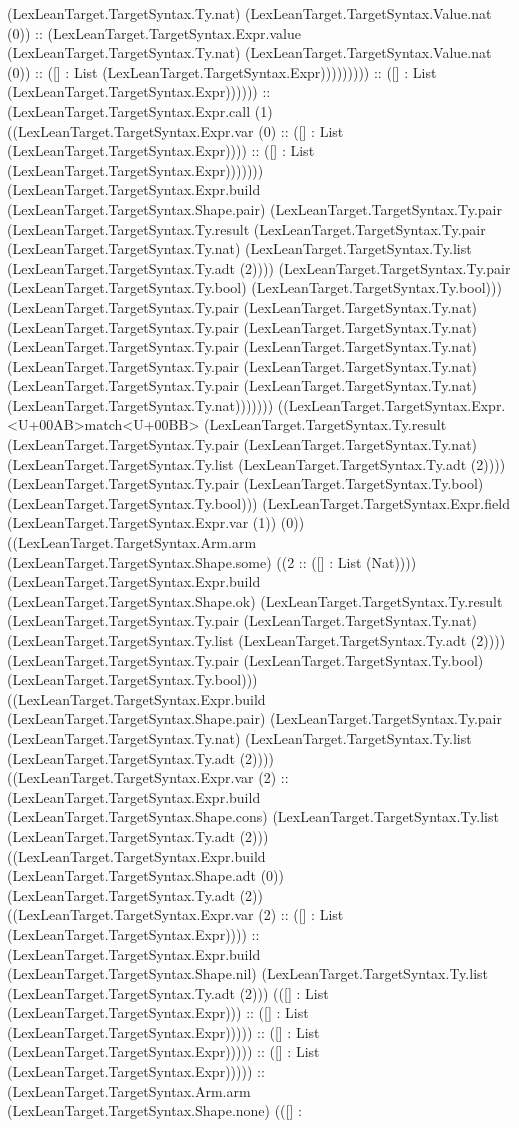 \documentclass[11pt]{article}
\begin{document}
(LexLeanTarget.TargetSyntax.Ty.nat) (LexLeanTarget.TargetSyntax.Value.nat (0)) :: (LexLeanTarget.TargetSyntax.Expr.value (LexLeanTarget.TargetSyntax.Ty.nat) (LexLeanTarget.TargetSyntax.Value.nat (0)) :: ([] : List (LexLeanTarget.TargetSyntax.Expr))))))))) :: ([] : List (LexLeanTarget.TargetSyntax.Expr)))))) :: (LexLeanTarget.TargetSyntax.Expr.call (1) ((LexLeanTarget.TargetSyntax.Expr.var (0) :: ([] : List (LexLeanTarget.TargetSyntax.Expr)))) :: ([] : List (LexLeanTarget.TargetSyntax.Expr))))))) (LexLeanTarget.TargetSyntax.Expr.build (LexLeanTarget.TargetSyntax.Shape.pair) (LexLeanTarget.TargetSyntax.Ty.pair (LexLeanTarget.TargetSyntax.Ty.result (LexLeanTarget.TargetSyntax.Ty.pair (LexLeanTarget.TargetSyntax.Ty.nat) (LexLeanTarget.TargetSyntax.Ty.list (LexLeanTarget.TargetSyntax.Ty.adt (2)))) (LexLeanTarget.TargetSyntax.Ty.pair (LexLeanTarget.TargetSyntax.Ty.bool) (LexLeanTarget.TargetSyntax.Ty.bool))) (LexLeanTarget.TargetSyntax.Ty.pair (LexLeanTarget.TargetSyntax.Ty.nat) (LexLeanTarget.TargetSyntax.Ty.pair (LexLeanTarget.TargetSyntax.Ty.nat) (LexLeanTarget.TargetSyntax.Ty.pair (LexLeanTarget.TargetSyntax.Ty.nat) (LexLeanTarget.TargetSyntax.Ty.pair (LexLeanTarget.TargetSyntax.Ty.nat) (LexLeanTarget.TargetSyntax.Ty.pair (LexLeanTarget.TargetSyntax.Ty.nat) (LexLeanTarget.TargetSyntax.Ty.nat))))))) ((LexLeanTarget.TargetSyntax.Expr.<U+00AB>match<U+00BB> (LexLeanTarget.TargetSyntax.Ty.result (LexLeanTarget.TargetSyntax.Ty.pair (LexLeanTarget.TargetSyntax.Ty.nat) (LexLeanTarget.TargetSyntax.Ty.list (LexLeanTarget.TargetSyntax.Ty.adt (2)))) (LexLeanTarget.TargetSyntax.Ty.pair (LexLeanTarget.TargetSyntax.Ty.bool) (LexLeanTarget.TargetSyntax.Ty.bool))) (LexLeanTarget.TargetSyntax.Expr.field (LexLeanTarget.TargetSyntax.Expr.var (1)) (0)) ((LexLeanTarget.TargetSyntax.Arm.arm (LexLeanTarget.TargetSyntax.Shape.some) ((2 :: ([] : List (Nat)))) (LexLeanTarget.TargetSyntax.Expr.build (LexLeanTarget.TargetSyntax.Shape.ok) (LexLeanTarget.TargetSyntax.Ty.result (LexLeanTarget.TargetSyntax.Ty.pair (LexLeanTarget.TargetSyntax.Ty.nat) (LexLeanTarget.TargetSyntax.Ty.list (LexLeanTarget.TargetSyntax.Ty.adt (2)))) (LexLeanTarget.TargetSyntax.Ty.pair (LexLeanTarget.TargetSyntax.Ty.bool) (LexLeanTarget.TargetSyntax.Ty.bool))) ((LexLeanTarget.TargetSyntax.Expr.build (LexLeanTarget.TargetSyntax.Shape.pair) (LexLeanTarget.TargetSyntax.Ty.pair (LexLeanTarget.TargetSyntax.Ty.nat) (LexLeanTarget.TargetSyntax.Ty.list (LexLeanTarget.TargetSyntax.Ty.adt (2)))) ((LexLeanTarget.TargetSyntax.Expr.var (2) :: (LexLeanTarget.TargetSyntax.Expr.build (LexLeanTarget.TargetSyntax.Shape.cons) (LexLeanTarget.TargetSyntax.Ty.list (LexLeanTarget.TargetSyntax.Ty.adt (2))) ((LexLeanTarget.TargetSyntax.Expr.build (LexLeanTarget.TargetSyntax.Shape.adt (0)) (LexLeanTarget.TargetSyntax.Ty.adt (2)) ((LexLeanTarget.TargetSyntax.Expr.var (2) :: ([] : List (LexLeanTarget.TargetSyntax.Expr)))) :: (LexLeanTarget.TargetSyntax.Expr.build (LexLeanTarget.TargetSyntax.Shape.nil) (LexLeanTarget.TargetSyntax.Ty.list (LexLeanTarget.TargetSyntax.Ty.adt (2))) (([] : List (LexLeanTarget.TargetSyntax.Expr))) :: ([] : List (LexLeanTarget.TargetSyntax.Expr))))) :: ([] : List (LexLeanTarget.TargetSyntax.Expr))))) :: ([] : List (LexLeanTarget.TargetSyntax.Expr))))) :: (LexLeanTarget.TargetSyntax.Arm.arm (LexLeanTarget.TargetSyntax.Shape.none) (([] : 
\end{document}
